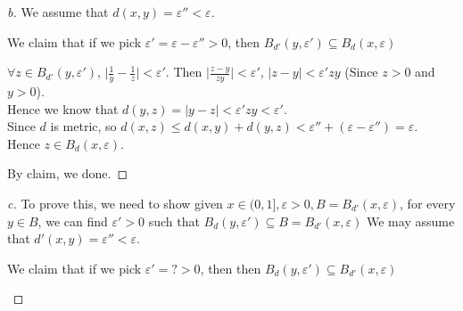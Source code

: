 \begin{proof}[b]
    We assume that $d(x,y) = \varepsilon'' < \varepsilon$.
    \begin{claim}
        We claim that if we pick $\varepsilon' = \varepsilon - \varepsilon'' > 0$, then $B_{d'}(y,\varepsilon') \subseteq B_d(x,\varepsilon)$
    \end{claim}
    \begin{explanation}
        $\forall z \in B_{d'}(y, \varepsilon')$, $\lvert \frac{1}{y} - \frac{1}{z} \rvert < \varepsilon'$. Then $\lvert \frac{z-y}{zy} \rvert < \varepsilon'$, $\lvert z-y \rvert < \varepsilon'zy$ (Since $z > 0$ and $y > 0$). \\
        Hence we know that $d(y,z) = \lvert y-z \rvert < \varepsilon'zy < \varepsilon'$. \\
        Since $d$ is metric, so $d(x,z) \leq d(x,y) + d(y,z) < \varepsilon'' + (\varepsilon - \varepsilon'') = \varepsilon$. \\
        Hence $z \in B_d(x, \varepsilon)$.
    \end{explanation}
    By claim, we done.
\end{proof}

\begin{proof}[c]
    To prove this, we need to show given $x \in (0,1], \varepsilon >0, B = B_{d'}(x, \varepsilon)$, for every $y \in B$, we can find $\varepsilon' > 0$ such that $B_d(y, \varepsilon') \subseteq B = B_{d'}(x, \varepsilon)$
    We may assume that $d'(x,y) = \varepsilon'' < \varepsilon$.
    \begin{claim}
        We claim that if we pick $\varepsilon' = ? > 0$, then then $B_{d}(y,\varepsilon') \subseteq B_{d'}(x,\varepsilon)$
    \end{claim}
    \begin{explanation}
        
    \end{explanation}
    
\end{proof}


